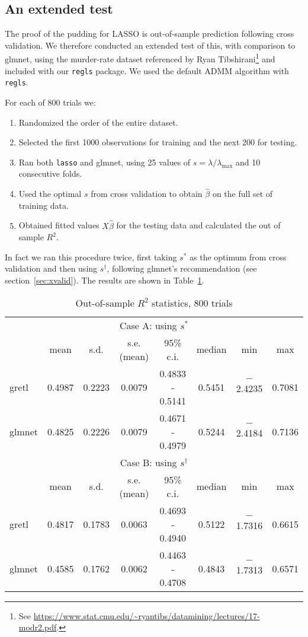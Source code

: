 \documentclass{article}
\begin{document}
\subsection*{An extended test}

The proof of the pudding for LASSO is out-of-sample prediction
following cross validation. We therefore conducted an extended test of
this, with comparison to \textsf{glmnet}, using the murder-rate
dataset referenced by Ryan Tibshirani\footnote{See
  \url{https://www.stat.cmu.edu/~ryantibs/datamining/lectures/17-modr2.pdf}.}
and included with our \texttt{regls} package. We used the default ADMM
algorithm with \texttt{regls}.

For each of 800 trials we:
\begin{enumerate}
\item Randomized the order of the entire dataset.
\item Selected the first 1000 observations for training and the next
  200 for testing.
\item Ran both \texttt{lasso} and \textsf{glmnet}, using 25 values
  of $s = \lambda/\lambda_{\max}$ and 10 consecutive folds.
\item Used the optimal $s$ from cross validation to obtain
  $\hat{\beta}$ on the full set of training data.
\item Obtained fitted values $X\hat{\beta}$ for the testing data and
  calculated the out of sample $R^2$.
\end{enumerate}

In fact we ran this procedure twice, first taking $s^*$ as the optimum
from cross validation and then using $s^{\dagger}$, following
\textsf{glmnet}'s recommendation (see section~\ref{sec:xvalid}). The
results are shown in Table~\ref{tab:bigtest}.

\begin{table}[htbp]
  \centering
  \begin{tabular}{lccccccc}
    \multicolumn{8}{c}{Case A: using $s^*$} \\
 & mean & s.d. & s.e.(mean) & 95\% c.i. & median & min & max \\
\textsf{gretl} & 0.4987 & 0.2223 & 0.0079 & 0.4833 - 0.5141 & 0.5451 & $-$2.4235 & 0.7081 \\
\textsf{glmnet} & 0.4825 & 0.2226 & 0.0079 & 0.4671 - 0.4979 & 0.5244 & $-$2.4184 & 0.7136 \\[8pt]
    \multicolumn{8}{c}{Case B: using $s^{\dagger}$} \\
 & mean & s.d. & s.e.(mean) & 95\% c.i. & median & min & max \\
\textsf{gretl} & 0.4817 & 0.1783 & 0.0063 & 0.4693 - 0.4940 & 0.5122 & $-$1.7316 & 0.6615 \\
\textsf{glmnet} & 0.4585 & 0.1762 & 0.0062 & 0.4463 - 0.4708 & 0.4843 & $-$1.7313 & 0.6571 \\
  \end{tabular}
  \caption{Out-of-sample $R^2$ statistics, 800 trials}
  \label{tab:bigtest}
\end{table}
\end{document}
